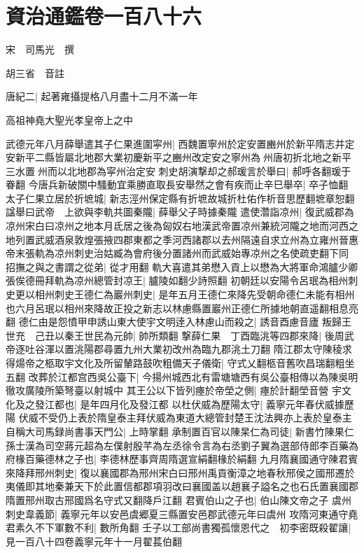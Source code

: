 \chapter{資治通鑑卷一百八十六}
宋　司馬光　撰

胡三省　音註

唐紀二|{
	起著雍攝提格八月盡十二月不滿一年}


高祖神堯大聖光孝皇帝上之中

武德元年八月薛舉遣其子仁果進圍寜州|{
	西魏置寧州於定安置豳州於新平隋志并定安新平二縣皆屬北地郡大業初慶新平之豳州改定安之寧州為州唐初折北地之新平三水置州而以北地郡為寜州治定安}
刺史胡演撃却之郝瑗言於舉曰|{
	郝呼各翻瑗于眷翻}
今唐兵新破關中騷動宜乘勝直取長安舉然之會有疾而止辛巳舉卒|{
	卒子恤翻}
太子仁果立居於折墌城|{
	新志涇州保定縣有折墌故城折杜佑作析音思歷翻墌章恕翻}
諡舉曰武帝　上欲與李軌共圖秦隴|{
	薛舉父子時據秦隴}
遣使濳詣凉州|{
	復武威郡為凉州宋白曰凉州之地本月氐居之後為匈奴右地漢武帝置凉州兼統河隴之地而河西之地列置武威酒泉敦煌張掖四郡東都之季河西諸郡以去州隔遠自求立州為立雍州晉惠帝末張軌為凉州刺史治姑臧為會府後分置諸州而武威始專凉州之名使疏吏翻下同}
招撫之與之書謂之從弟|{
	從才用翻}
軌大喜遣其弟懋入貢上以懋為大將軍命鴻臚少卿張俟德冊拜軌為凉州總管封凉王|{
	臚陵如翻少詩照翻}
初朝廷以安陽令呂珉為相州刺史更以相州刺史王德仁為巖州刺史|{
	是年五月王德仁來降先受朝命德仁未能有相州也六月呂珉以相州來降故正投之新志以林慮縣置巖州正德仁所據地朝直遥翻相息亮翻}
德仁由是怨憤甲申誘山東大使宇文明逹入林慮山而殺之|{
	誘音酉慮音廬}
叛歸王世充　己丑以秦王世民為元帥|{
	帥所類翻}
撃薛仁果　丁酉臨洮等四郡來降|{
	後周武帝逐吐谷渾以置洮陽郡尋置九州大業初改州為臨九郡洮土刀翻}
隋江郡太守陳稜求得煬帝之柩取宇文化及所留輦路鼓吹粗備天子儀衛|{
	守式乂翻柩音舊吹昌瑞翻粗坐五翻}
改葬於江都宫西吳公臺下|{
	今揚州城西北有雷塘塘西有吳公臺相傳以為陳吳明徹攻廣陵所築弩臺以射城中}
其王公以下皆列瘞於帝塋之側|{
	瘞於計翻塋音營}
宇文化及之發江都也|{
	是年四月化及發江都}
以杜伏威為歷陽太守|{
	義寧元年春伏威據歷陽}
伏威不受仍上表於隋皇泰主拜伏威為東道大總管封楚王沈法興亦上表於皇泰主自稱大司馬録尚書事天門公|{
	上時掌翻}
承制置百官以陳杲仁為司徒|{
	新書竹陳果仁}
孫士漢為司空蔣元超為左僕射殷芊為左丞徐令言為右丞劉子翼為選部侍郎李百藥為府椽百藥德林之子也|{
	李德林歷事齊周隋選宣絹翻椽於絹翻}
九月隋襄國通守陳君賓來降拜邢州刺史|{
	復以襄國郡為邢州宋白曰邢州禹貢衡漳之地春秋邢侯之國邢遷於夷儀即其地秦兼天下於此置信都郡項羽改曰襄國盖以趙襄子謚名之也石氏置襄國郡隋置邢州取古邢國爲名守式又翻降戶江翻}
君賓伯山之子也|{
	伯山陳文帝之子}
虞州刺史韋義節|{
	義寧元年以安邑虞郷夏三縣置安邑郡武德元年曰虞州}
攻隋河東通守堯君素久不下軍數不利|{
	數所角翻}
壬子以工部尚書獨孤懷恩代之　初李密既殺翟讓|{
	見一百八十四卷義寧元年十一月翟萇伯翻}
